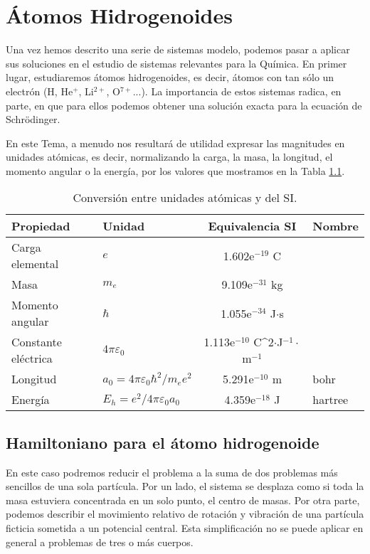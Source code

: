 \chapter{Átomos Hidrogenoides}
Una vez hemos descrito una serie de sistemas modelo, podemos
pasar a aplicar sus soluciones en el estudio de sistemas
relevantes para la Química. En primer lugar, estudiaremos 
átomos hidrogenoides, es decir, átomos con tan sólo un
electrón (H, He$^+$, Li$^{2+}$, O$^{7+}$...). La importancia
de estos sistemas radica, en parte, en que para ellos
podemos obtener una solución exacta para la ecuación de
Schrödinger.

En este Tema, a menudo nos resultará de utilidad expresar las 
magnitudes en unidades atómicas, es decir, normalizando la carga, 
la masa, la longitud, el momento angular o la energía, por los 
valores que mostramos en la Tabla \ref{tb:au}.

\begin{table}[h!]
    \centering
    \small{}
    \begin{tabular}{|l|l|c|l|}
    \hline
         Propiedad & Unidad & Equivalencia SI& Nombre  \\
    \hline
    \hline
         Carga elemental &$e$ & 1.602e$^{-19}$ C & \\ 
         Masa & $m_e$ & 9.109e$^{-31}$ kg & \\ 
         Momento angular & $\hbar$ & 1.055e$^{-34}$ J$\cdot$s & \\ 
         Constante eléctrica & $4\pi \varepsilon_0$ & 1.113e$^{-10}$ C^2$\cdot$J$^{-1}\cdot$m$^{-1}$ &\\
         Longitud & $a_0=4\pi \varepsilon_0\hbar^2/m_ee^2$ & 5.291e$^{-10}$ m & bohr \\ 
         Energía & $E_h=e^2/4\pi \varepsilon_0a_0$  & 4.359e$^{-18}$ J & hartree \\ 
    \hline
    \end{tabular}
    \caption{Conversión entre unidades atómicas y del SI.}
    \label{tb:au}
\end{table}

\section{Hamiltoniano para el átomo hidrogenoide}
En este caso podremos reducir el problema a la suma de dos problemas 
más sencillos de una sola partícula. Por un lado, el sistema se 
desplaza como si toda la masa estuviera concentrada en un solo punto,
el centro de masas. Por otra parte, podemos describir el movimiento 
relativo de rotación y vibración de una partícula ficticia sometida 
a un potencial central. Esta simplificación no se puede aplicar en 
general a problemas de tres o más cuerpos.

